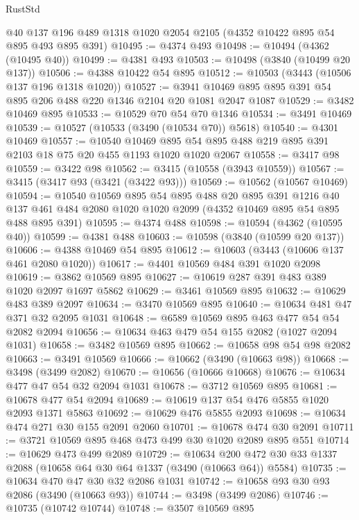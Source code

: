 \begin{lexlean}{RustStd}
\begin{coremodule}
    @40
    @137
    @196
    @489
    @1318
    @1020
    @2054
    @2105
    (@4352 @10422 @895 @54 @895 @493 @895 @391)
@10495 := @4374 @493
@10498 := @10494 (@4362 (@10495 @40))
@10499 := @4381 @493
@10503 := @10498 (@3840 (@10499 @20 @137))
@10506 := @4388 @10422 @54 @895
@10512 := @10503 (@3443 (@10506 @137 @196 @1318 @1020))
@10527 := @3941 @10469 @895 @895 @391 @54 @895 @206 @488 @220 @1346 @2104 @20 @1081 @2047 @1087
@10529 := @3482 @10469 @895
@10533 := @10529 @70 @54 @70 @1346
@10534 := @3491 @10469
@10539 := @10527 (@10533 (@3490 (@10534 @70)) @5618)
@10540 := @4301 @10469
@10557 := @10540
    @10469
    @895
    @54
    @895
    @488
    @219
    @895
    @391
    @2103
    @18
    @75
    @20
    @455
    @1193
    @1020
    @1020
    @2067
@10558 := @3417 @98
@10559 := @3422 @98
@10562 := @3415 (@10558 (@3943 @10559))
@10567 := @3415 (@3417 @93 (@3421 (@3422 @93)))
@10569 := @10562 (@10567 @10469)
@10594 := @10540
    @10569
    @895
    @54
    @895
    @488
    @20
    @895
    @391
    @1216
    @40
    @137
    @461
    @484
    @2080
    @1020
    @1020
    @2099
    (@4352 @10469 @895 @54 @895 @488 @895 @391)
@10595 := @4374 @488
@10598 := @10594 (@4362 (@10595 @40))
@10599 := @4381 @488
@10603 := @10598 (@3840 (@10599 @20 @137))
@10606 := @4388 @10469 @54 @895
@10612 := @10603 (@3443 (@10606 @137 @461 @2080 @1020))
@10617 := @4401 @10569 @484 @391 @1020 @2098
@10619 := @3862 @10569 @895
@10627 := @10619 @287 @391 @483 @389 @1020 @2097 @1697 @5862
@10629 := @3461 @10569 @895
@10632 := @10629 @483 @389 @2097
@10634 := @3470 @10569 @895
@10640 := @10634 @481 @47 @371 @32 @2095 @1031
@10648 := @6589 @10569 @895 @463 @477 @54 @54 @2082 @2094
@10656 := @10634 @463 @479 @54 @155 @2082 (@1027 @2094 @1031)
@10658 := @3482 @10569 @895
@10662 := @10658 @98 @54 @98 @2082
@10663 := @3491 @10569
@10666 := @10662 (@3490 (@10663 @98))
@10668 := @3498 (@3499 @2082)
@10670 := @10656 (@10666 @10668)
@10676 := @10634 @477 @47 @54 @32 @2094 @1031
@10678 := @3712 @10569 @895
@10681 := @10678 @477 @54 @2094
@10689 := @10619 @137 @54 @476 @5855 @1020 @2093 @1371 @5863
@10692 := @10629 @476 @5855 @2093
@10698 := @10634 @474 @271 @30 @155 @2091 @2060
@10701 := @10678 @474 @30 @2091
@10711 := @3721 @10569 @895 @468 @473 @499 @30 @1020 @2089 @895 @551
@10714 := @10629 @473 @499 @2089
@10729 := @10634 @200 @472 @30 @33 @1337 @2088 (@10658 @64 @30 @64 @1337 (@3490 (@10663 @64)) @5584)
@10735 := @10634 @470 @47 @30 @32 @2086 @1031
@10742 := @10658 @93 @30 @93 @2086 (@3490 (@10663 @93))
@10744 := @3498 (@3499 @2086)
@10746 := @10735 (@10742 @10744)
@10748 := @3507 @10569 @895

\end{coremodule}
\end{lexlean}
